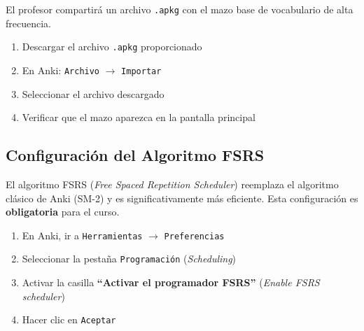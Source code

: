 \documentclass[12pt,a4paper]{article}
\begin{document}
\begin{cajapaso}
El profesor compartirá un archivo \texttt{.apkg} con el mazo base de vocabulario de alta frecuencia.

\begin{enumerate}[leftmargin=1.2cm]
  \item Descargar el archivo \texttt{.apkg} proporcionado
  \item En Anki: \texttt{Archivo} $\rightarrow$ \texttt{Importar}
  \item Seleccionar el archivo descargado
  \item Verificar que el mazo aparezca en la pantalla principal
\end{enumerate}
\end{cajapaso}

\subsection{Configuración del Algoritmo FSRS}

\begin{cajaalerta}
El algoritmo FSRS (\textit{Free Spaced Repetition Scheduler}) reemplaza el algoritmo clásico de Anki (SM-2) y es significativamente más eficiente. Esta configuración es \textbf{obligatoria} para el curso.
\end{cajaalerta}

\begin{cajapaso}
\begin{enumerate}[leftmargin=1.2cm]
  \item En Anki, ir a \texttt{Herramientas} $\rightarrow$ \texttt{Preferencias}
  \item Seleccionar la pestaña \texttt{Programación} (\textit{Scheduling})
  \item Activar la casilla \textbf{``Activar el programador FSRS''} (\textit{Enable FSRS scheduler})
  \item Hacer clic en \texttt{Aceptar}
\end{enumerate}
\end{cajapaso}
\end{document}
